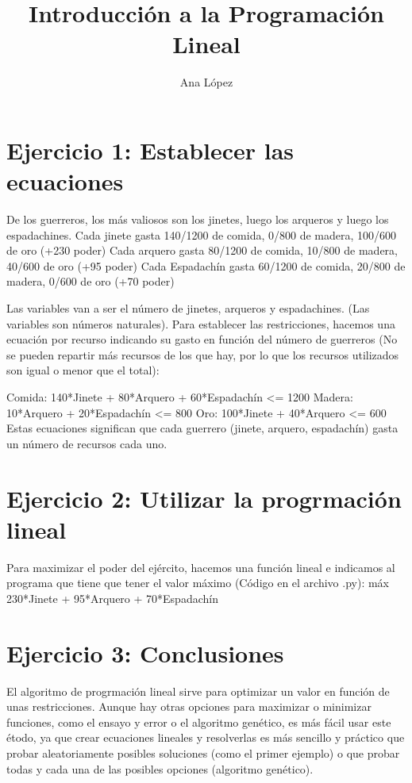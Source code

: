 \documentclass[a4paper, 10pt]{article}
\title{Introducción a la Programación Lineal}
\author{Ana López}
\begin{document}
    \maketitle
    \part{Ejercicio 1: Establecer las ecuaciones}
    De los guerreros, los más valiosos son los jinetes, luego los arqueros y luego los espadachines. 
    Cada jinete gasta 140/1200 de comida, 0/800 de madera, 100/600 de oro (+230 poder)
    Cada arquero gasta 80/1200 de comida, 10/800 de madera, 40/600 de oro (+95 poder)
    Cada Espadachín gasta 60/1200 de comida, 20/800 de madera, 0/600 de oro (+70 poder)

    Las variables van a ser el n\'umero de jinetes, arqueros y espadachines. (Las variables son n\'umeros naturales). Para establecer las restricciones, hacemos una ecuaci\'on por recurso indicando su gasto en funci\'on del n\'umero de guerreros (No se pueden repartir m\'as recursos de los que hay, por lo que los recursos utilizados son igual o menor que el total):

    Comida: 140*Jinete + 80*Arquero + 60*Espadach\'in <= 1200 
    Madera: 10*Arquero + 20*Espadach\'in <= 800
    Oro: 100*Jinete + 40*Arquero <= 600
    Estas ecuaciones significan que cada guerrero (jinete, arquero, espadach\'in) gasta un n\'umero de recursos cada uno.

    \part{Ejercicio 2: Utilizar la progrmaci\'on lineal}
    Para maximizar el poder del ej\'ercito, hacemos una funci\'on lineal e indicamos al programa que tiene que tener el valor m\'aximo (C\'odigo en el archivo .py):
    m\'ax 230*Jinete + 95*Arquero + 70*Espadach\'in

    \part{Ejercicio 3: Conclusiones}
    El algoritmo de progrmaci\'on lineal sirve para optimizar un valor en funci\'on de unas restricciones. Aunque hay otras opciones para maximizar o minimizar funciones, como el ensayo y error o el algoritmo gen\'etico, es más f\'acil usar este \'etodo, ya que crear ecuaciones lineales y resolverlas es m\'as sencillo y pr\'actico que probar aleatoriamente posibles soluciones (como el primer ejemplo) o que probar todas y cada una de las posibles opciones (algoritmo gen\'etico).
\end{document}
